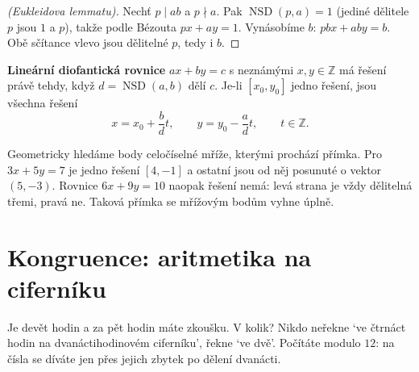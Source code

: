 \begin{proof}[(Eukleidova lemmatu)]
  Nechť $p\mid ab$ a $p\nmid a$. Pak $\operatorname{NSD}(p, a) = 1$ (jediné dělitele $p$ jsou $1$ a $p$), takže podle Bézouta $px + ay = 1$. Vynásobíme $b$: $pbx + aby = b$. Obě sčítance vlevo jsou dělitelné $p$, tedy i $b$.
\end{proof}

\begin{definitionbox}
  \textbf{Lineární diofantická rovnice} $ax + by = c$ s neznámými $x, y\in\mathbb{Z}$ má řešení právě tehdy, když $d = \operatorname{NSD}(a, b)$ dělí $c$. Je-li $[x_0, y_0]$ jedno řešení, jsou všechna řešení
  \begin{equation*}
    x = x_0 + \frac{b}{d}t,\qquad y = y_0 - \frac{a}{d}t,\qquad t\in\mathbb{Z}.
  \end{equation*}
\end{definitionbox}

Geometricky hledáme body celočíselné mříže, kterými prochází přímka. Pro $3x + 5y = 7$ je jedno řešení $[4, -1]$ a ostatní jsou od něj posunuté o vektor $(5, -3)$. Rovnice $6x + 9y = 10$ naopak řešení nemá: levá strana je vždy dělitelná třemi, pravá ne. Taková přímka se mřížovým bodům vyhne úplně.

\begin{center}
\end{center}

\section{Kongruence: aritmetika na ciferníku}

Je devět hodin a za pět hodin máte zkoušku. V kolik? Nikdo neřekne `ve čtrnáct hodin na dvanáctihodinovém ciferníku', řekne `ve dvě'. Počítáte modulo $12$: na čísla se díváte jen přes jejich zbytek po dělení dvanácti.

